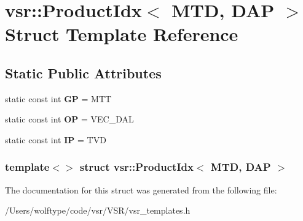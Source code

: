 \hypertarget{structvsr_1_1_product_idx_3_01_m_t_d_00_01_d_a_p_01_4}{\section{vsr\-:\-:Product\-Idx$<$ M\-T\-D, D\-A\-P $>$ Struct Template Reference}
\label{structvsr_1_1_product_idx_3_01_m_t_d_00_01_d_a_p_01_4}
}
\subsection*{Static Public Attributes}
\begin{DoxyCompactItemize}
\item 
\hypertarget{structvsr_1_1_product_idx_3_01_m_t_d_00_01_d_a_p_01_4_afe292be065e9a8fd61da4ff73a0dbb1e}{static const int {\bfseries G\-P} = M\-T\-T}\label{structvsr_1_1_product_idx_3_01_m_t_d_00_01_d_a_p_01_4_afe292be065e9a8fd61da4ff73a0dbb1e}

\item 
\hypertarget{structvsr_1_1_product_idx_3_01_m_t_d_00_01_d_a_p_01_4_ad71195dd9d0cdc461221ca0c38d049e9}{static const int {\bfseries O\-P} = V\-E\-C\-\_\-\-D\-A\-L}\label{structvsr_1_1_product_idx_3_01_m_t_d_00_01_d_a_p_01_4_ad71195dd9d0cdc461221ca0c38d049e9}

\item 
\hypertarget{structvsr_1_1_product_idx_3_01_m_t_d_00_01_d_a_p_01_4_a1d95add0f210ac64d65bf105f9358d74}{static const int {\bfseries I\-P} = T\-V\-D}\label{structvsr_1_1_product_idx_3_01_m_t_d_00_01_d_a_p_01_4_a1d95add0f210ac64d65bf105f9358d74}

\end{DoxyCompactItemize}
\subsubsection*{template$<$$>$ struct vsr\-::\-Product\-Idx$<$ M\-T\-D, D\-A\-P $>$}



The documentation for this struct was generated from the following file\-:\begin{DoxyCompactItemize}
\item 
/\-Users/wolftype/code/vsr/\-V\-S\-R/vsr\-\_\-templates.\-h\end{DoxyCompactItemize}
